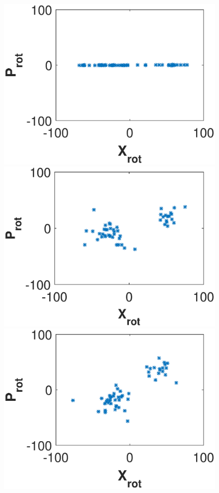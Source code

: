 \documentclass[aps,pre,twocolumn,groupedaddress]{revtex4-1}
\begin{document}
\begin{figure}
\includegraphics[scale=0.23]{ZhiyuPictures/10_18rotating_frame_t=0T_rev.eps} 
\includegraphics[scale=0.23]{ZhiyuPictures/10_18rotating_frame_t=20T_rev.eps}
\includegraphics[scale=0.23]{ZhiyuPictures/10_18rotating_frame_t=40T_rev.eps} 

\end{figure}
\end{document}
